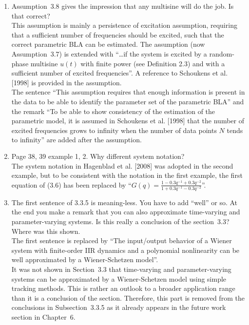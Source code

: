 \documentclass{article}
\newenvironment{answer}{\noindent\ignorespaces\color{blue}}{\noindent\ignorespacesafterend}
\newcommand{\ans}[1]{\begin{answer}#1\end{answer}}
\newcommand{\oldnewpage}[2]{\marginpar{{\color{black}#1} / {\color{red}#2}}}
\begin{document}
\begin{enumerate}
	\item Assumption~3.8 gives the impression that any multisine will do the job. Is that correct?\\
		\ans{This assumption is mainly a persistence of excitation assumption, requiring that a sufficient number of frequencies should be excited, such that the correct parametric BLA can be estimated.
			\oldnewpage{36}{40}The assumption (now Assumption~3.7) is extended with ``\ldots if the system is excited by a random-phase multisine $u(t)$ with finite power (see Definition 2.3) and with a sufficient number of excited frequencies''. A reference to Schoukens et al. [1998] is provided in the assumption.\\
			The sentence ``This assumption requires that enough information is present in the data to be able to identify the parameter set of the parametric BLA'' and the remark ``To be able to show consistency of the estimation of the parametric model, it is assumed in Schoukens et al. [1998] that the number of excited frequencies grows to infinity when the number of data points $N$ tends to infinity'' are added after the assumption.}
	\item Page 38, 39 example 1, 2. Why different system notation?\\
		\ans{\oldnewpage{38--39}{43}The system notation in Hagenblad et al. [2008] was adopted in the second example, but to be consistent with the notation in the first example, the first equation of (3.6) has been replaced by ``\mbox{$G(q) = \frac{1 -0.3q^{-1} + 0.3 q^{-2}}{1 + 0.3 q^{-1} - 0.3 q^{-2}}$}''.}
	\item The first sentence of 3.3.5 is meaning-less. You have to add ``well'' or so. At the end you make a remark that you can also approximate time-varying and parameter-varying systems. Is this really a conclusion of the section~3.3? Where was this shown.\\
		\ans{\oldnewpage{42}{46}The first sentence is replaced by ``The input/output behavior of a Wiener system with finite-order IIR dynamics and a polynomial nonlinearity can be well approximated by a Wiener-Schetzen model''.\\
			\oldnewpage{42 and~136}{46 and~140}It was not shown in Section~3.3 that time-varying and parameter-varying systems can be approximated by a Wiener-Schetzen model using simple tracking methods. This is rather an outlook to a broader application range than it is a conclusion of the section. Therefore, this part is removed from the conclusions in Subsection~3.3.5 as it already appears in the future work section in Chapter~6.}

\end{enumerate}
\end{document}
